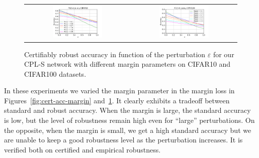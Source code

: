 \begin{figure}[h]
    \centering
    \begin{tabular}{cc}
    \includegraphics[width=0.49\textwidth]{sections/4_certification/images/pgd_acc_margin_eps_c10.pdf}&\includegraphics[width=0.49\textwidth]{sections/4_certification/images/pgd_acc_margin_eps_c100.pdf}
    \end{tabular}
    \caption{Certifiably robust accuracy in function of the perturbation $\varepsilon$ for our CPL-S  network with different margin parameters on CIFAR10 and CIFAR100 datasets.}
    \label{fig:pgd-acc-margin}
\end{figure}

In these experiments we varied the margin parameter in the margin loss in Figures~\ref{fig:cert-acc-margin} and~\ref{fig:pgd-acc-margin}. It clearly exhibits a tradeoff between standard and robust accuracy. When the margin is large, the standard accuracy is low, but the level of robustness remain high even for ``large'' perturbations. On the opposite, when the margin is small, we get a high standard accuracy but we are unable to keep a good robustness level as the perturbation increases. It is verified both on certified and empirical robustness.
